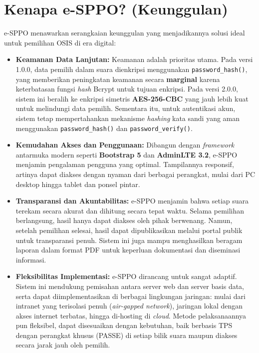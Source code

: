 \section{Kenapa e-SPPO? (Keunggulan)}
\label{sec:keunggulan_esppo}
e-SPPO menawarkan serangkaian keunggulan yang menjadikannya solusi ideal untuk pemilihan OSIS di era digital:
\begin{itemize}
	\item \textbf{Keamanan Data Lanjutan:} Keamanan adalah prioritas utama. Pada versi 1.0.0, data pemilih dalam suara dienkripsi menggunakan \texttt{password\_hash()}, yang memberikan peningkatan keamanan secara \textbf{marginal} karena keterbatasan fungsi \textit{hash} Bcrypt untuk tujuan enkripsi. Pada versi 2.0.0, sistem ini beralih ke enkripsi simetris \textbf{AES-256-CBC} yang jauh lebih kuat untuk melindungi data pemilih. Sementara itu, untuk autentikasi akun, sistem tetap mempertahankan mekanisme \textit{hashing} kata sandi yang aman menggunakan \texttt{password\_hash()} dan \texttt{password\_verify()}.
	\item \textbf{Kemudahan Akses dan Penggunaan:} Dibangun dengan \textit{framework} antarmuka modern seperti \textbf{Bootstrap 5} dan \textbf{AdminLTE 3.2}, e-SPPO menjamin pengalaman pengguna yang optimal. Tampilannya responsif, artinya dapat diakses dengan nyaman dari berbagai perangkat, mulai dari PC desktop hingga tablet dan ponsel pintar.
	\item \textbf{Transparansi dan Akuntabilitas:} e-SPPO menjamin bahwa setiap suara terekam secara akurat dan dihitung secara tepat waktu. Selama pemilihan berlangsung, hasil hanya dapat diakses oleh pihak berwenang. Namun, setelah pemilihan selesai, hasil dapat dipublikasikan melalui portal publik untuk transparansi penuh. Sistem ini juga mampu menghasilkan beragam laporan dalam format PDF untuk keperluan dokumentasi dan diseminasi informasi.
	\item \textbf{Fleksibilitas Implementasi:} e-SPPO dirancang untuk sangat adaptif. Sistem ini mendukung pemisahan antara server web dan server basis data, serta dapat diimplementasikan di berbagai lingkungan jaringan: mulai dari intranet yang terisolasi penuh (\textit{air-gapped network}), jaringan lokal dengan akses internet terbatas, hingga di-hosting di \textit{cloud}. Metode pelaksanaannya pun fleksibel, dapat disesuaikan dengan kebutuhan, baik berbasis TPS dengan perangkat khusus (PASSE) di setiap bilik suara maupun diakses secara jarak jauh oleh pemilih.
\end{itemize}

